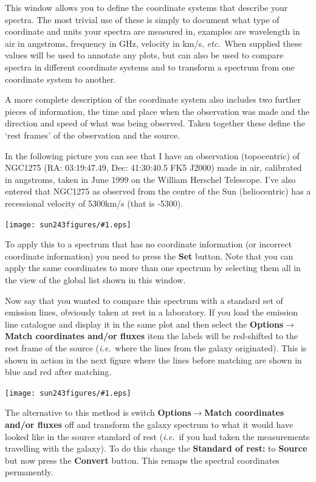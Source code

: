 \documentclass[twoside,11pt]{article}
\newcommand{\htmladdimg}[1]{}
\newcommand{\latexhtml}[2]{#1}
\renewcommand{\_}{\texttt{\symbol{95}}}
\newcommand{\mainfigure}[1]
{\begin{center}
 \latexhtml{\texttt{[image: sun243\_figures/\#1.eps]}}{\htmladdimg{#1.gif}}
 \end{center}
}
\newcommand{\submenuitem}[2]{\latexhtml{\textbf{#1$\rightarrow$#2}}{\textbf{#1->#2}}}
\newcommand{\labelitem}[1]{\textbf{#1}}
\newcommand{\ie}{\textit{i.e.}}
\newcommand{\etc}{\textit{etc.}}
\begin{document}
This window allows you to define the coordinate systems that describe your
spectra. The most trivial use of these is simply to document what type of
coordinate and units your spectra are measured in, examples are wavelength in
air in angstroms, frequency in GHz, velocity in km/s, \etc\ When supplied
these values will be used to annotate any plots, but can also be used to
compare spectra in different coordinate systems and to transform a spectrum
from one coordinate system to another.

A more complete description of the coordinate system also includes two further
pieces of information, the time and place when the observation was made and
the direction and speed of what was being observed. Taken together these
define the `rest frames' of the observation and the source.

In the following picture you can see that I have an observation (topocentric)
of NGC1275 (RA: 03:19:47.49, Dec: 41:30:40.5 FK5 J2000) made in air,
calibrated in angstroms, taken in June 1999 on the William Herschel
Telescope. I've also entered that NGC1275 as observed from the centre of the
Sun (heliocentric) has a recessional velocity of 5300km/s (that is -5300).

\mainfigure{coordinatesystemwindow}

To apply this to a spectrum that has no coordinate information (or incorrect
coordinate information) you need to press the \labelitem{Set} button. Note
that you can apply the same coordinates to more than one spectrum by selecting
them all in the view of the global list shown in this window.

Now say that you wanted to compare this spectrum with a standard set of
emission lines, obviously taken at rest in a laboratory. If you load the
emission line catalogue and display it in the same plot and then select the
\submenuitem{Options}{Match coordinates and/or fluxes} item the labels will be
red-shifted to the rest frame of the source (\ie\ where the lines from the
galaxy originated). This is shown in action in the next figure where the lines
before matching are shown in blue and red after matching.

\mainfigure{coordinatesystemplot}

The alternative to this method is switch
\submenuitem{Options}{Match coordinates and/or fluxes} off and transform the
galaxy spectrum to what it would have looked like in the source standard of
rest (\ie\ if you had taken the measurements travelling with the galaxy). To
do this change the \labelitem{Standard of rest:} to \labelitem{Source} but now
press the \labelitem{Convert} button. This remaps the spectral coordinates
permanently.
\end{document}
